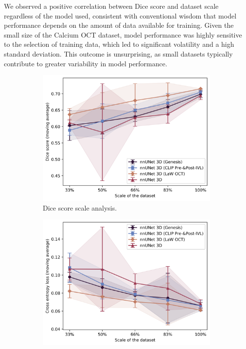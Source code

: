 \documentclass[a4paper,11pt,oneside]{report}
\begin{document}
We observed a positive correlation between Dice score and dataset scale regardless of the model used, consistent with conventional wisdom that model performance depends on the amount of data available for training. Given the small size of the Calcium OCT dataset, model performance was highly sensitive to the selection of training data, which led to significant volatility and a high standard deviation. This outcome is unsurprising, as small datasets typically contribute to greater variability in model performance.

\begin{figure}[hbt]
    \centering
    \begin{subfigure}[t]{0.49\textwidth}
        \includegraphics[width=1\linewidth]{figures/discussion_scale_analysis.png}
        \caption{Dice score scale analysis.}
        \label{fig:scale-analysis}
    \end{subfigure}%
    \begin{subfigure}[t]{0.49\textwidth}
        \includegraphics[width=1\linewidth]{figures/discussion_cross_entropy_scale_analysis.png}

\end{subfigure}
\end{figure}
\end{document}
